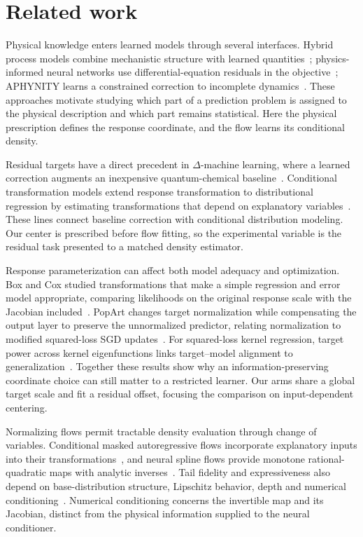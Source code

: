 \section{Related work}
\label{sec:related_target_centering}

Physical knowledge enters learned models through several interfaces. Hybrid
process models combine mechanistic structure with learned quantities~\cite{PsichogiosUngar1992};
physics-informed neural networks use differential-equation residuals in the
objective~\cite{RaissiPerdikarisKarniadakis2019}; APHYNITY learns a constrained
correction to incomplete dynamics~\cite{YinEtAl2021}. These approaches motivate
studying which part of a prediction problem is assigned to the physical
description and which part remains statistical. Here the physical prescription
defines the response coordinate, and the flow learns its conditional density.

Residual targets have a direct precedent in $\Delta$-machine learning, where
a learned correction augments an inexpensive quantum-chemical baseline~\cite{RamakrishnanEtAl2015}.
Conditional transformation models extend response transformation to
distributional regression by estimating transformations that depend on
explanatory variables~\cite{HothornKneibBuhlmann2014}. These lines connect
baseline correction with conditional distribution modeling. Our center is
prescribed before flow fitting, so the experimental variable is the residual
task presented to a matched density estimator.

Response parameterization can affect both model adequacy and optimization.
Box and Cox studied transformations that make a simple regression and error
model appropriate, comparing likelihoods on the original response scale with
the Jacobian included~\cite{BoxCox1964}. PopArt changes target normalization
while compensating the output layer to preserve the unnormalized predictor,
relating normalization to modified squared-loss SGD updates~\cite{VanHasseltEtAl2016}.
For squared-loss kernel regression, target power across kernel eigenfunctions
links target--model alignment to generalization~\cite{CanatarBordelonPehlevan2021}.
Together these results show why an information-preserving coordinate choice
can still matter to a restricted learner. Our arms share a global target scale
and fit a residual offset, focusing the comparison on input-dependent centering.

Normalizing flows permit tractable density evaluation through change of
variables. Conditional masked autoregressive flows incorporate explanatory
inputs into their transformations~\cite{PapamakariosPavlakouMurray2017},
and neural spline flows provide monotone rational-quadratic maps with analytic
inverses~\cite{DurkanEtAl2019}. Tail fidelity and expressiveness also depend on
base-distribution structure, Lipschitz behavior, depth and numerical
conditioning~\cite{JainiKobyzevYuBrubaker2020,KoehlerMehtaRisteski2021}.
Numerical conditioning concerns the invertible map and its Jacobian, distinct
from the physical information supplied to the neural conditioner.

